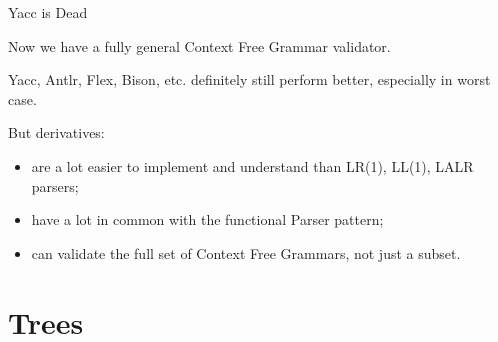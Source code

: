 \documentclass[10pt]{beamer}
\begin{document}
\begin{frame}{Yacc is Dead}


Now we have a fully general Context Free Grammar validator.

Yacc, Antlr, Flex, Bison, etc.  definitely still perform better, especially in worst case.

But derivatives:
\begin{itemize}
\item are a lot easier to implement and understand than LR(1), LL(1), LALR parsers;
\item have a lot in common with the functional Parser pattern;
\item can validate the full set of Context Free Grammars, not just a subset.
\end{itemize}
\end{frame}

\section{Trees}

\end{document}
